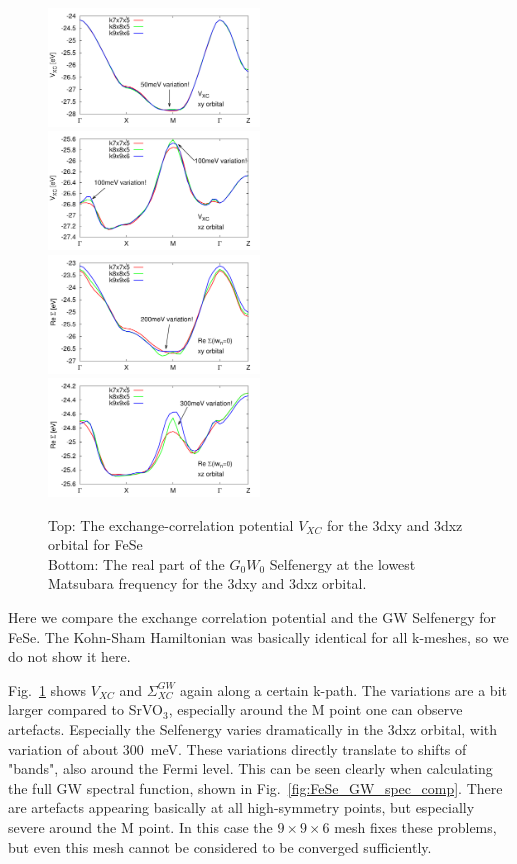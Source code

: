 \documentclass[12pt,a4paper]{scrartcl}
\numberwithin{equation}{section}
\begin{document}
\begin{figure}[h]
\includegraphics[width=0.5\textwidth]{figs/kmesh/FeSe/vxc_kpath_xy.pdf}
\includegraphics[width=0.5\textwidth]{figs/kmesh/FeSe/vxc_kpath_xz.pdf}
\includegraphics[width=0.5\textwidth]{figs/kmesh/FeSe/ReSigma_kpath_xy.pdf}
\includegraphics[width=0.5\textwidth]{figs/kmesh/FeSe/ReSigma_kpath_xz.pdf}
\caption{Top: The exchange-correlation potential $V_{XC}$
for the 3dxy and 3dxz orbital for FeSe \\
Bottom: The real part of the $G_0W_0$ Selfenergy at the lowest Matsubara frequency
for the 3dxy and 3dxz orbital. }
\label{fig:FeSe_kpath_kmesh_comp}
\end{figure}

Here we compare the exchange correlation potential and the GW Selfenergy
for FeSe. The Kohn-Sham Hamiltonian was basically identical for all
k-meshes, so we do not show it here.

Fig.~\ref{fig:FeSe_kpath_kmesh_comp} shows $V_{XC}$ and $\Sigma^{GW}_{XC}$ again
along a certain k-path.
The variations are a bit larger compared to SrVO$_3$, especially around
the M point one can observe artefacts. Especially the Selfenergy
varies dramatically in the 3dxz orbital, with variation of about $300$~meV.
These variations directly translate to shifts of "bands", also around the Fermi
level. 
This can be seen clearly when calculating the full
GW spectral function, shown in Fig.~\ref{fig:FeSe_GW_spec_comp}.
There are artefacts appearing basically at all high-symmetry points,
but especially severe around the M point.
In this case the $9\times 9\times 6 $ mesh fixes these problems, but 
even this mesh cannot be considered to be converged sufficiently.
\end{document}
